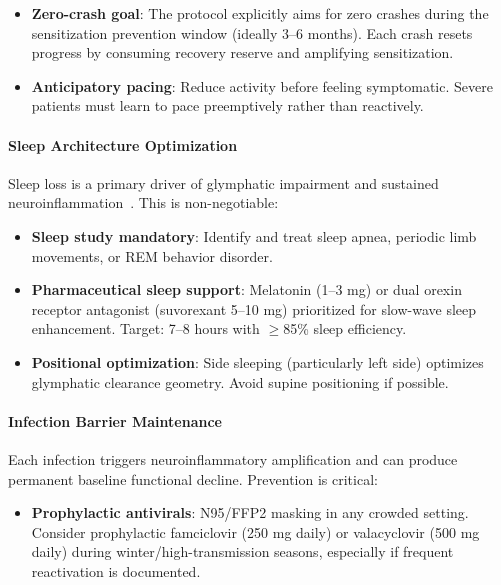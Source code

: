 \begin{protocol}
\begin{itemize}
    \item \textbf{Zero-crash goal}: The protocol explicitly aims for zero crashes during the sensitization prevention window (ideally 3--6 months). Each crash resets progress by consuming recovery reserve and amplifying sensitization.

    \item \textbf{Anticipatory pacing}: Reduce activity before feeling symptomatic. Severe patients must learn to pace preemptively rather than reactively.
\end{itemize}

\paragraph{Sleep Architecture Optimization}

Sleep loss is a primary driver of glymphatic impairment and sustained neuroinflammation~\cite{MCMC2024Neurometabolic}. This is non-negotiable:
\begin{itemize}
    \item \textbf{Sleep study mandatory}: Identify and treat sleep apnea, periodic limb movements, or REM behavior disorder.

    \item \textbf{Pharmaceutical sleep support}: Melatonin (1--3 mg) or dual orexin receptor antagonist (suvorexant 5--10 mg) prioritized for slow-wave sleep enhancement. Target: 7--8 hours with $\geq$85\% sleep efficiency.

    \item \textbf{Positional optimization}: Side sleeping (particularly left side) optimizes glymphatic clearance geometry. Avoid supine positioning if possible.
\end{itemize}

\paragraph{Infection Barrier Maintenance}

Each infection triggers neuroinflammatory amplification and can produce permanent baseline functional decline. Prevention is critical:
\begin{itemize}
    \item \textbf{Prophylactic antivirals}: N95/FFP2 masking in any crowded setting. Consider prophylactic famciclovir (250 mg daily) or valacyclovir (500 mg daily) during winter/high-transmission seasons, especially if frequent reactivation is documented.


\end{itemize}
\end{protocol}
